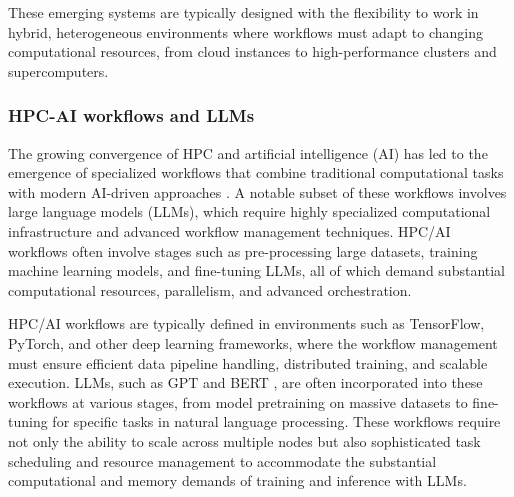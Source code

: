 These emerging systems are typically designed with the flexibility to work in hybrid, heterogeneous environments where workflows must adapt to changing computational resources, from cloud instances to high-performance clusters and supercomputers.

\subsubsection{HPC-AI workflows and LLMs}




The growing convergence of HPC and artificial intelligence (AI) has led to the emergence of specialized workflows that combine traditional computational tasks with modern AI-driven approaches \citep{mcclure2020}. A notable subset of these workflows involves large language models (LLMs), which require highly specialized computational infrastructure and advanced workflow management techniques. HPC/AI workflows often involve stages such as pre-processing large datasets, training machine learning models, and fine-tuning LLMs, all of which demand substantial computational resources, parallelism, and advanced orchestration.

HPC/AI workflows are typically defined in environments such as TensorFlow, PyTorch, and other deep learning frameworks, where the workflow management must ensure efficient data pipeline handling, distributed training, and scalable execution. LLMs, such as GPT \citep{gpt-report} and BERT \cite{bert-report}, are often incorporated into these workflows at various stages, from model pretraining on massive datasets to fine-tuning for specific tasks in natural language processing. These workflows require not only the ability to scale across multiple nodes but also sophisticated task scheduling and resource management to accommodate the substantial computational and memory demands of training and inference with LLMs.

